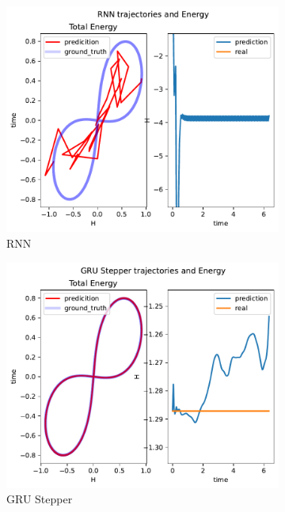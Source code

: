 \begin{figure}[H]
	\begin{subfigure}[b]{0.3\textwidth}
		\centering
		\includegraphics[width=\textwidth]{chapters/chapter5/body3_rnn_traj.pdf}
		\caption{RNN}
	\end{subfigure}
	\hfill
	\begin{subfigure}[b]{0.3\textwidth}
		\centering
		\includegraphics[width=\textwidth]{chapters/chapter5/body3_gre_traj.pdf}
		\caption{GRU Stepper}
	\end{subfigure}
	\hfill
	\begin{subfigure}[b]{0.3\textwidth}

\end{subfigure}
\end{figure}
